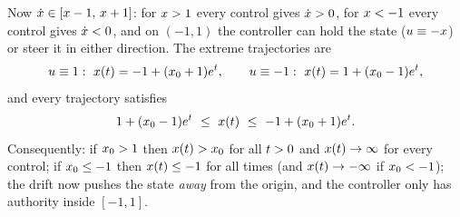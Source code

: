 Now $\dot{{x}}\in[{x}-1,\,{x}+1]$: for ${x}>1$ every control gives $\dot{{x}}>0$, for
${x}<-1$ every control gives $\dot{{x}}<0$, and on $(-1,1)$ the controller can hold the state
(${u}\equiv-{x}$) or steer it in either direction. The extreme trajectories are
\[
\ctrl\equiv1:\ \state(\tvar)=-1+(\state_0+1)e^{\tvar},\qquad
\ctrl\equiv-1:\ \state(\tvar)=1+(\state_0-1)e^{\tvar},
\]
and every trajectory satisfies
\begin{equation}\label{eq:unstable-bounds}
1+(\state_0-1)e^{\tvar}\ \le\ \state(\tvar)\ \le\ -1+(\state_0+1)e^{\tvar}.
\end{equation}
Consequently: if ${x}_0>1$ then ${x}({t})>{x}_0$ for all ${t}>0$ and
${x}({t})\to\infty$ for every control; if ${x}_0\le-1$ then ${x}({t})\le-1$ for all
times (and ${x}({t})\to-\infty$ if ${x}_0<-1$); the drift now pushes the state \emph{away}
from the origin, and the controller only has authority inside $[-1,1]$.

